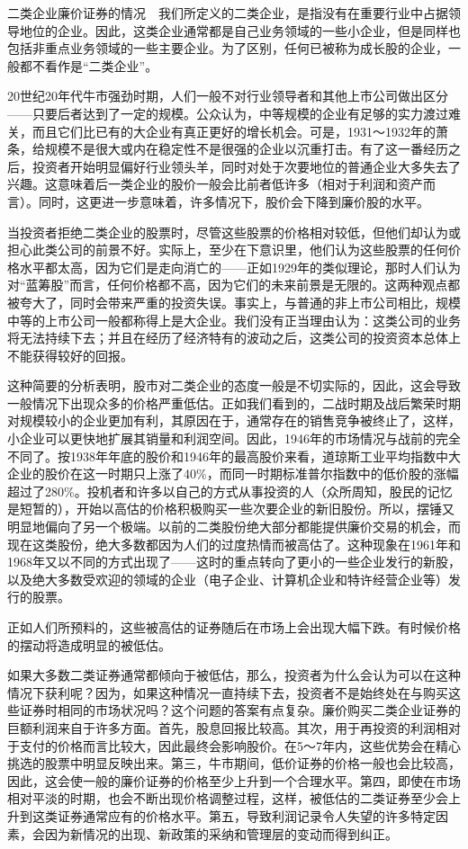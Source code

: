 \documentclass[12pt,oneside]{book}
\begin{document}
二类企业廉价证券的情况　我们所定义的二类企业，是指没有在重要行业中占据领导地位的企业。因此，这类企业通常都是自己业务领域的一些小企业，但是同样也包括非重点业务领域的一些主要企业。为了区别，任何已被称为成长股的企业，一般都不看作是“二类企业”。

20世纪20年代牛市强劲时期，人们一般不对行业领导者和其他上市公司做出区分——只要后者达到了一定的规模。公众认为，中等规模的企业有足够的实力渡过难关，而且它们比已有的大企业有真正更好的增长机会。可是，1931～1932年的萧条，给规模不是很大或内在稳定性不是很强的企业以沉重打击。有了这一番经历之后，投资者开始明显偏好行业领头羊，同时对处于次要地位的普通企业大多失去了兴趣。这意味着后一类企业的股价一般会比前者低许多（相对于利润和资产而言）。同时，这更进一步意味着，许多情况下，股价会下降到廉价股的水平。

当投资者拒绝二类企业的股票时，尽管这些股票的价格相对较低，但他们却认为或担心此类公司的前景不好。实际上，至少在下意识里，他们认为这些股票的任何价格水平都太高，因为它们是走向消亡的——正如1929年的类似理论，那时人们认为对“蓝筹股”而言，任何价格都不高，因为它们的未来前景是无限的。这两种观点都被夸大了，同时会带来严重的投资失误。事实上，与普通的非上市公司相比，规模中等的上市公司一般都称得上是大企业。我们没有正当理由认为：这类公司的业务将无法持续下去；并且在经历了经济特有的波动之后，这类公司的投资资本总体上不能获得较好的回报。

这种简要的分析表明，股市对二类企业的态度一般是不切实际的，因此，这会导致一般情况下出现众多的价格严重低估。正如我们看到的，二战时期及战后繁荣时期对规模较小的企业更加有利，其原因在于，通常存在的销售竞争被终止了，这样，小企业可以更快地扩展其销量和利润空间。因此，1946年的市场情况与战前的完全不同了。按1938年年底的股价和1946年的最高股价来看，道琼斯工业平均指数中大企业的股价在这一时期只上涨了40\%，而同一时期标准普尔指数中的低价股的涨幅超过了280\%。投机者和许多以自己的方式从事投资的人（众所周知，股民的记忆是短暂的），开始以高估的价格积极购买一些次要企业的新旧股份。所以，摆锤又明显地偏向了另一个极端。以前的二类股份绝大部分都能提供廉价交易的机会，而现在这类股份，绝大多数都因为人们的过度热情而被高估了。这种现象在1961年和1968年又以不同的方式出现了——这时的重点转向了更小的一些企业发行的新股，以及绝大多数受欢迎的领域的企业（电子企业、计算机企业和特许经营企业等）发行的股票。

正如人们所预料的，这些被高估的证券随后在市场上会出现大幅下跌。有时候价格的摆动将造成明显的被低估。

如果大多数二类证券通常都倾向于被低估，那么，投资者为什么会认为可以在这种情况下获利呢？因为，如果这种情况一直持续下去，投资者不是始终处在与购买这些证券时相同的市场状况吗？这个问题的答案有点复杂。廉价购买二类企业证券的巨额利润来自于许多方面。首先，股息回报比较高。其次，用于再投资的利润相对于支付的价格而言比较大，因此最终会影响股价。在5～7年内，这些优势会在精心挑选的股票中明显反映出来。第三，牛市期间，低价证券的价格一般也会比较高，因此，这会使一般的廉价证券的价格至少上升到一个合理水平。第四，即使在市场相对平淡的时期，也会不断出现价格调整过程，这样，被低估的二类证券至少会上升到这类证券通常应有的价格水平。第五，导致利润记录令人失望的许多特定因素，会因为新情况的出现、新政策的采纳和管理层的变动而得到纠正。
\end{document}
